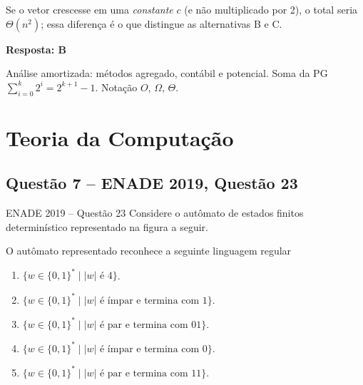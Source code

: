 \documentclass[11pt,a4paper]{article}
\newcommand{\resposta}[1]{\begin{gabarito}\textbf{Resposta: #1}\end{gabarito}}
\begin{document}
Se o vetor crescesse em uma \emph{constante} $c$ (e não multiplicado por 2), o total seria
$\Theta(n^2)$; essa diferença é o que distingue as alternativas B e C.

\resposta{B}

\begin{dica}
Análise amortizada: métodos agregado, contábil e potencial. Soma da PG $\sum_{i=0}^{k}2^i = 2^{k+1}-1$.
Notação $O$, $\Omega$, $\Theta$.
\end{dica}

\section{Teoria da Computação}

\subsection{Questão 7 -- ENADE 2019, Questão 23}
\begin{enunciado}{ENADE 2019 -- Questão 23}
Considere o autômato de estados finitos determinístico representado na figura a seguir.
\begin{center}
\end{center}
O autômato representado reconhece a seguinte linguagem regular
\begin{enumerate}[label=\Alph*)]
  \item $\{w \in \{0,1\}^* \mid |w| \text{ é } 4\}$.
  \item $\{w \in \{0,1\}^* \mid |w| \text{ é ímpar e termina com } 1\}$.
  \item $\{w \in \{0,1\}^* \mid |w| \text{ é par e termina com } 01\}$.
  \item $\{w \in \{0,1\}^* \mid |w| \text{ é ímpar e termina com } 0\}$.
  \item $\{w \in \{0,1\}^* \mid |w| \text{ é par e termina com } 11\}$.
\end{enumerate}
\end{enunciado}
\end{document}
